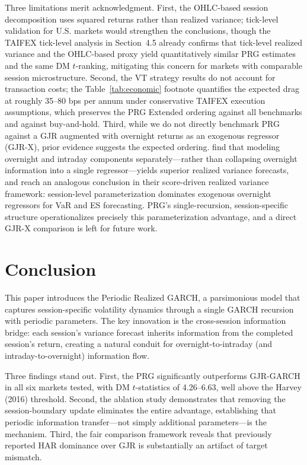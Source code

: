 \documentclass[11pt,a4paper]{article}
\begin{document}
Three limitations merit acknowledgment. First, the OHLC-based session decomposition uses squared returns rather than realized variance; tick-level validation for U.S. markets would strengthen the conclusions, though the TAIFEX tick-level analysis in Section~4.5 already confirms that tick-level realized variance and the OHLC-based proxy yield quantitatively similar PRG estimates and the same DM $t$-ranking, mitigating this concern for markets with comparable session microstructure. Second, the VT strategy results do not account for transaction costs; the Table~\ref{tab:economic} footnote quantifies the expected drag at roughly 35--80 bps per annum under conservative TAIFEX execution assumptions, which preserves the PRG Extended ordering against all benchmarks and against buy-and-hold. Third, while we do not directly benchmark PRG against a GJR augmented with overnight returns as an exogenous regressor (GJR-X), prior evidence suggests the expected ordering. \citet{Todorova2014} find that modeling overnight and intraday components separately---rather than collapsing overnight information into a single regressor---yields superior realized variance forecasts, and \citet{Opschoor2021} reach an analogous conclusion in their score-driven realized variance framework: session-level parameterization dominates exogenous overnight regressors for VaR and ES forecasting. PRG's single-recursion, session-specific structure operationalizes precisely this parameterization advantage, and a direct GJR-X comparison is left for future work.


\section{Conclusion}

This paper introduces the Periodic Realized GARCH, a parsimonious model that captures session-specific volatility dynamics through a single GARCH recursion with periodic parameters. The key innovation is the cross-session information bridge: each session's variance forecast inherits information from the completed session's return, creating a natural conduit for overnight-to-intraday (and intraday-to-overnight) information flow.

Three findings stand out. First, the PRG significantly outperforms GJR-GARCH in all six markets tested, with DM $t$-statistics of 4.26--6.63, well above the Harvey (2016) threshold. Second, the ablation study demonstrates that removing the session-boundary update eliminates the entire advantage, establishing that periodic information transfer---not simply additional parameters---is the mechanism. Third, the fair comparison framework reveals that previously reported HAR dominance over GJR is substantially an artifact of target mismatch.
\end{document}

